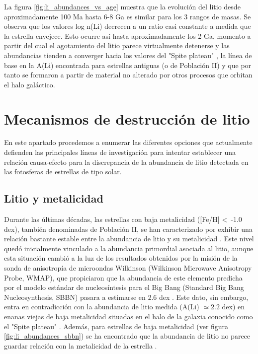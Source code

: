 La figura \ref{fig:li_abundances_vs_age} muestra que la evolución del litio desde aproximadamente 100 Ma hasta 6-8 Ga es similar para los 3 rangos de masas. Se observa que los valores log n(Li) decrecen a un ratio casi constante a medida que la estrella envejece. Esto ocurre así hasta aproximadamente los 2 Ga, momento a partir del cual el agotamiento del litio parece virtualmente detenerse y las abundancias tienden a converger hacia los valores del "Spite plateau" \citep{Spite1982}, la línea de base en la A(Li) encontrada para estrellas antiguas (o de Población II) y que por tanto se formaron a partir de material no alterado por otros procesos que orbitan el halo galáctico. \par

\section{Mecanismos de destrucción de litio}
En este apartado procedemos a enumerar las diferentes opciones que actualmente defienden las principales líneas de investigación para intentar establecer una relación causa-efecto para la discrepancia de la abundancia de litio detectada en las fotosferas de estrellas de tipo solar.\par

\subsection{Litio y metalicidad}
Durante las últimas décadas, las estrellas con baja metalicidad ([Fe/H] <\, -1.0 dex), también denominadas de Población II, se han caracterizado por exhibir una relación bastante estable entre la abundancia de litio y su metalicidad \citep{Guiglion2016}. Este nivel quedó inicialmente vinculado a la abundancia primordial asociada al litio, aunque esta situación cambió a la luz de los resultados obtenidos por la misión de la sonda de anisotropía de microondas Wilkinson (Wilkinson Microwave Anisotropy Probe, WMAP), que propiciaron que la abundancia de este elemento predicha por el modelo estándar de nucleosíntesis para el Big Bang (Standard Big Bang Nucleosynthesis, SBBN) pasara a estimarse en 2.6 dex \citep{Spergel2003}. Este dato, sin embargo, entra en contradicción con la abundancia de litio medida (A(Li) $\simeq 2.2$ dex) en enanas viejas de baja metalicidad situadas en el halo de la galaxia conocido como el "Spite plateau" \citep{Spite1982}. Además, para estrellas de baja metalicidad (ver figura \ref{fig:li_abundances_sbbn}) se ha encontrado que la abundancia de litio no parece guardar relación con la metalicidad de la estrella \citep{Fu2015}.\par


